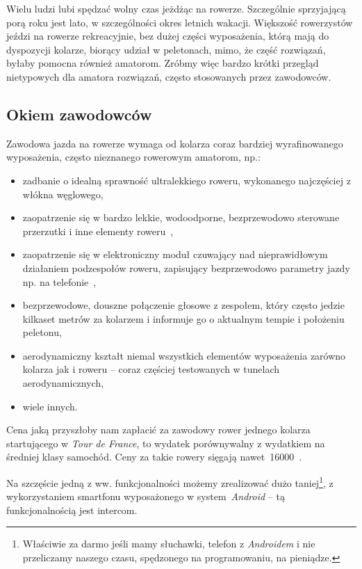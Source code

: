 \documentclass{article}
\begin{document}
Wielu ludzi lubi spędzać wolny czas jeżdżąc na rowerze. Szczególnie sprzyjającą porą roku jest lato, w szczególności okres letnich wakacji. Większość rowerzystów jeździ na rowerze rekreacyjnie, bez dużej części wyposażenia, którą mają do dyspozycji kolarze, biorący udział w peletonach, mimo, że część rozwiązań, byłaby pomocna również amatorom. Zróbmy więc bardzo krótki przegląd nietypowych dla amatora rozwiązań, często stosowanych przez zawodowców.


\subsection{Okiem zawodowców}

Zawodowa jazda na rowerze wymaga od kolarza coraz bardziej wyrafinowanego wyposażenia, często nieznanego rowerowym amatorom, np.:
\begin{itemize}
\item zadbanie o idealną sprawność ultralekkiego roweru, wykonanego najczęściej z włókna węglowego,
\item zaopatrzenie się w bardzo lekkie, wodoodporne, bezprzewodowo sterowane przerzutki i inne elementy roweru~\cite{www:campagnolo-shifts}\cite{www:campagnolo-shifts-video},
\item zaopatrzenie się w elektroniczny moduł czuwający nad nieprawidłowym działaniem podzespołów roweru, zapisujący bezprzewodowo parametry jazdy np. na telefonie~\cite{www:campagnolo-computer}\cite{www:campagnolo-computer-video}\cite{www:campagnolo-computer-adjustment-video},
\item bezprzewodowe, douszne połączenie głosowe z zespołem, który często jedzie kilkaset metrów za kolarzem i informuje go o aktualnym tempie i położeniu peletonu,
\item aerodynamiczny kształt niemal wszystkich elementów wyposażenia zarówno kolarza jak i roweru -- coraz częściej testowanych w tunelach aerodynamicznych,
\item wiele innych.
\end{itemize}
Cena jaką przyszłoby nam zapłacić za zawodowy rower jednego kolarza startującego w \emph{Tour de France}, to wydatek porównywalny z wydatkiem na średniej klasy samochód. Ceny za takie rowery sięgają nawet~16000\textsterling~\cite{www:racing-bikes}\cite{www:tdf-bike}.

Na szczęście jedną z ww. funkcjonalności możemy zrealizować dużo taniej\footnote{Właściwie za darmo jeśli mamy słuchawki, telefon z \emph{Androidem} i nie przeliczamy naszego czasu, spędzonego na programowaniu, na pieniądze.}, z wykorzystaniem smartfonu wyposażonego w system~\emph{Android} -- tą funkcjonalnością jest intercom.
\end{document}
